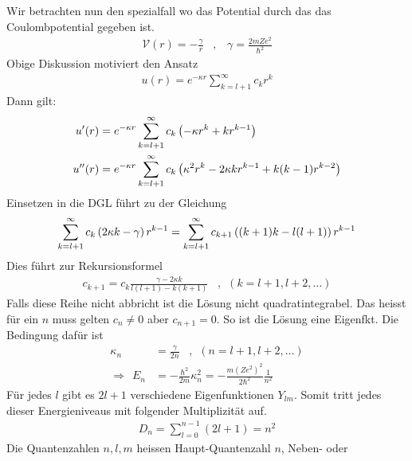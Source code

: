 Wir betrachten nun den spezialfall wo das Potential durch das das Coulombpotential
gegeben ist.
\begin{align*}
    \mathcal{V}(r) = - \frac{\gamma}{r}
    \hspace{10pt} , \hspace{10pt}
    \gamma = \frac{2m Z e^2}{\hbar^2}
\end{align*}
Obige Diskussion motiviert den Ansatz
\begin{align*}
    u(r) = e^{-\kappa r} \sum_{k = l+1}^\infty c_k r^k
\end{align*}
Dann gilt:
\begin{align*}
    u'(r) &= e^{-\kappa r} \sum_{k=l+1}^\infty c_k \left( -\kappa r^k + k r^{k-1} \right)
    \\
    u''(r) &= e^{-\kappa r} \sum_{k=l+1}^\infty c_k \left( \kappa^2 r^k - 2 \kappa k r^{k-1} + k(k-1)r^{k-2} \right)
\end{align*}
Einsetzen in die DGL führt zu der Gleichung
\begin{align*}
    \sum_{k=l+1}^\infty c_k \left( 2 \kappa k - \gamma \right) r^{k-1} =
    \sum_{k=l+1}^\infty c_{k+1} \left( (k+1)k - l(l+1) \right) r^{k-1}
\end{align*}
Dies führt zur Rekursionsformel
\begin{align*}
    c_{k+1} = c_k \frac{\gamma - 2 \kappa k}{l(l+1) - k(k+1)}
    \hspace{10pt} , \hspace{5pt}
    (k=l+1,l+2,\dots)
\end{align*}
Falls diese Reihe nicht abbricht ist die Lösung nicht quadratintegrabel.
Das heisst für ein $n$ muss gelten $c_n \neq 0$ aber $c_{n+1} = 0$.
So ist die Lösung eine Eigenfkt. Die Bedingung dafür ist
\begin{align*}
    \kappa_n &= \frac{\gamma}{2n} \hspace{10pt} , \hspace{5pt} (n=l+1,l+2,\dots)
    \\
    \Rightarrow \hspace{5pt}
    E_n &= - \frac{\hbar^2}{2m} \kappa_n^2 = - \frac{m (Ze^2)^2}{2 \hbar^2} \frac{1}{n^2}
\end{align*}
Für jedes $l$ gibt es $2l+1$ verschiedene Eigenfunktionen $Y_{lm}$. Somit tritt
jedes dieser Energieniveaus mit folgender Multiplizität auf.
\begin{align*}
    D_n = \sum_{l=0}^{n-1} (2l+1) = n^2
\end{align*}
Die Quantenzahlen $n,l,m$ heissen Haupt-Quantenzahl $n$, Neben- oder
